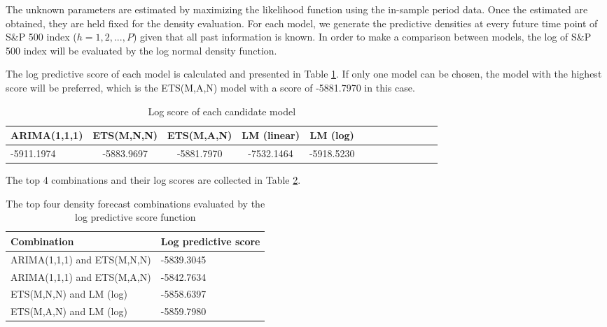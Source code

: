 \documentclass{monashthesis}
\begin{document}
The unknown parameters are estimated by maximizing the likelihood function using the in-sample period data. Once the estimated are obtained, they are held fixed for the density evaluation. For each model, we generate the predictive densities at every future time point of S\&P 500 index (\(h=1,2,...,P\)) given that all past information is known. In order to make a comparison between models, the log of S\&P 500 index will be evaluated by the log normal density function.

The log predictive score of each model is calculated and presented in Table \ref{tab:1}. If only one model can be chosen, the model with the highest score will be preferred, which is the ETS(M,A,N) model with a score of -5881.7970 in this case.

\vspace{0.3cm}

\begin{table}[htbp!]
\centering
\caption{Log score of each candidate model}
\begin{tabular}{l*{4}{c}cccccccc}
\hline
     ARIMA(1,1,1) & ETS(M,N,N) & ETS(M,A,N) & LM (linear) & LM (log) \\
    \hline
     -5911.1974 & -5883.9697  & -5881.7970 & -7532.1464 & -5918.5230\\
    \hline
\end{tabular}
\label{tab:1}
\end{table}

The top 4 combinations and their log scores are collected in Table \ref{tab:3}.

\begin{table}[ht]
  \centering
  \caption{The top four density forecast combinations evaluated by the log predictive score function}
    \begin{tabular}{ll}
    \toprule
    Combination & Log predictive score \\
    \midrule
    ARIMA(1,1,1) and ETS(M,N,N) & -5839.3045 \\
    ARIMA(1,1,1) and ETS(M,A,N) & -5842.7634 \\
    ETS(M,N,N) and  LM (log) & -5858.6397 \\
    ETS(M,A,N) and  LM (log) & -5859.7980 \\
    \bottomrule
    \end{tabular}
  \label{tab:3}
\end{table}

\printbibliography[title={Reference}]
\end{document}
